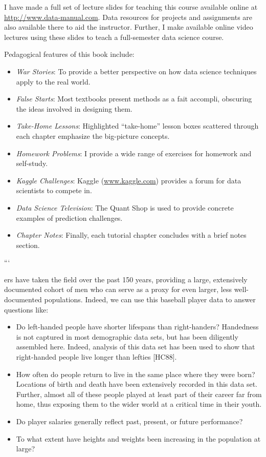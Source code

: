 \documentclass[10pt]{article}
\begin{document}
I have made a full set of lecture slides for teaching this course available online at \url{http://www.data-manual.com}. Data resources for projects and assignments are also available there to aid the instructor. Further, I make available online video lectures using these slides to teach a full-semester data science course.

Pedagogical features of this book include:
\begin{itemize}
  \item \textit{War Stories}: To provide a better perspective on how data science techniques apply to the real world.
  \item \textit{False Starts}: Most textbooks present methods as a fait accompli, obscuring the ideas involved in designing them.
  \item \textit{Take-Home Lessons}: Highlighted ``take-home'' lesson boxes scattered through each chapter emphasize the big-picture concepts.
  \item \textit{Homework Problems}: I provide a wide range of exercises for homework and self-study.
  \item \textit{Kaggle Challenges}: Kaggle (\url{www.kaggle.com}) provides a forum for data scientists to compete in.
  \item \textit{Data Science Television}: The Quant Shop is used to provide concrete examples of prediction challenges.
  \item \textit{Chapter Notes}: Finally, each tutorial chapter concludes with a brief notes section. 
\end{itemize}
```

ers have taken the field over the past 150 years, providing a large, extensively documented cohort of men who can serve as a proxy for even larger, less well-documented populations. Indeed, we can use this baseball player data to answer questions like:

\begin{itemize}
  \item Do left-handed people have shorter lifespans than right-handers? Handedness is not captured in most demographic data sets, but has been diligently assembled here. Indeed, analysis of this data set has been used to show that right-handed people live longer than lefties [HC88].
  \item How often do people return to live in the same place where they were born? Locations of birth and death have been extensively recorded in this data set. Further, almost all of these people played at least part of their career far from home, thus exposing them to the wider world at a critical time in their youth.
  \item Do player salaries generally reflect past, present, or future performance?
  \item To what extent have heights and weights been increasing in the population at large?
\end{itemize}
\end{document}
